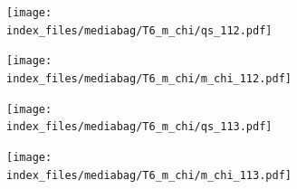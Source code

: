 \documentclass[
  11pt,
  letterpaper,
]{scrreprt}
\begin{document}
\begin{figure}

\begin{minipage}{0.50\linewidth}

\begin{figure}[H]

{\centering \texttt{[image: index\_files/mediabag/T6\_m\_chi/qs\_112.pdf]}

}


\end{figure}%

\end{minipage}%
%
\begin{minipage}{0.50\linewidth}

\begin{figure}[H]

{\centering \texttt{[image: index\_files/mediabag/T6\_m\_chi/m\_chi\_112.pdf]}

}


\end{figure}%

\end{minipage}%

\end{figure}%

\begin{figure}

\begin{minipage}{0.50\linewidth}

\begin{figure}[H]

{\centering \texttt{[image: index\_files/mediabag/T6\_m\_chi/qs\_113.pdf]}

}


\end{figure}%

\end{minipage}%
%
\begin{minipage}{0.50\linewidth}

\begin{figure}[H]

{\centering \texttt{[image: index\_files/mediabag/T6\_m\_chi/m\_chi\_113.pdf]}

}


\end{figure}%

\end{minipage}%

\end{figure}%
\end{document}
